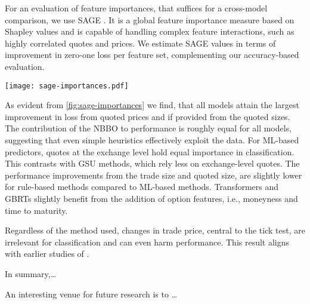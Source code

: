 For an evaluation of feature importances, that suffices for a cross-model comparison, we use \gls{SAGE} \autocite{covertUnderstandingGlobalFeature2020}. It is a global feature importance measure based on Shapley values and is capable of handling complex feature interactions, such as highly correlated quotes and prices. We estimate \gls{SAGE} values in terms of improvement in zero-one loss per feature set, complementing our accuracy-based evaluation.

\begin{figure*}[h]
    \centering
    \texttt{[image: sage-importances.pdf]}
    \caption[ Feature Importances]{\gls{SAGE} feature importances of rule-based and \gls{ML}-based classifiers. Importances estimated on \gls{ISE} test set with zero-one loss. Bigger feature importances are better. For the feature set classical the \gls{GSU} method (small) is used and otherwise the \gls{GSU} method (large).}
    \label{fig:sage-importances}
\end{figure*}

As evident from \cref{fig:sage-importances} we find, that all models attain the largest improvement in loss from quoted prices and if provided from the quoted sizes. The contribution of the \gls{NBBO} to performance is roughly equal for all models, suggesting that even simple heuristics effectively exploit the data. For \gls{ML}-based predictors, quotes at the exchange level hold equal importance in classification. This contrasts with \gls{GSU} methods, which rely less on exchange-level quotes.  The performance improvements from the trade size and quoted size, are slightly lower for rule-based methods compared to \gls{ML}-based methods. Transformers and \glspl{GBRT} slightly benefit from the addition of option features, i.e., moneyness and time to maturity. 

Regardless of the method used, changes in trade price, central to the tick test, are irrelevant for classification and can even harm performance. This result aligns with earlier studies of \textcites{savickasInferringDirectionOption2003}{grauerOptionTradeClassification2022}.

In summary,\dots

An interesting venue for future research is to \dots


